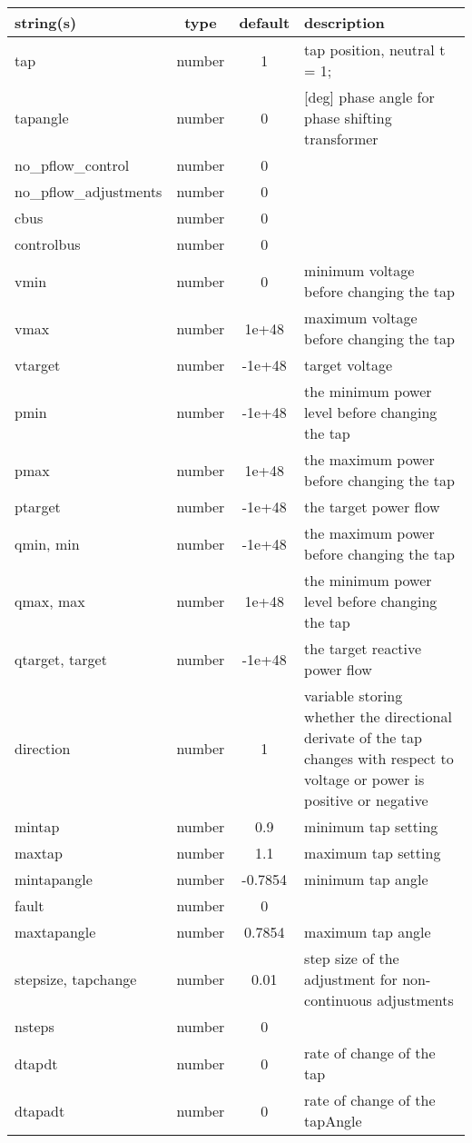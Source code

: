 \begin{longtable}{p{5cm} c c p{7cm}}
string(s) & type & default & description \\
\hline
tap & number & 1 & tap position, neutral t = 1;\\
tapangle & number & 0 & [deg] phase angle for phase shifting transformer\\
no\_pflow\_control & number & 0 & \\
no\_pflow\_adjustments & number & 0 & \\
cbus & number & 0 & \\
controlbus & number & 0 & \\
vmin & number & 0 & minimum voltage before changing the tap\\
vmax & number & 1e+48 & maximum voltage before changing the tap\\
vtarget & number & -1e+48 & target voltage\\
pmin & number & -1e+48 & the minimum power level before changing the tap\\
pmax & number & 1e+48 & the maximum power before changing the tap\\
ptarget & number & -1e+48 & the target power flow\\
qmin, min & number & -1e+48 & the maximum power before changing the tap\\
qmax, max & number & 1e+48 & the minimum power level before changing the tap\\
qtarget, target & number & -1e+48 & the target reactive power flow\\
direction & number & 1 & variable storing whether the directional derivate of the tap changes with respect to voltage or power is positive or negative\\
mintap & number & 0.9 & minimum tap setting\\
maxtap & number & 1.1 & maximum tap setting\\
mintapangle & number & -0.7854 & minimum tap angle\\
fault & number & 0 & \\
maxtapangle & number & 0.7854 & maximum tap angle\\
stepsize, tapchange & number & 0.01 & step size of the adjustment for non-continuous adjustments\\
nsteps & number & 0 & \\
dtapdt & number & 0 & rate of change of the tap\\
dtapadt & number & 0 & rate of change of the tapAngle\\

\end{longtable}
